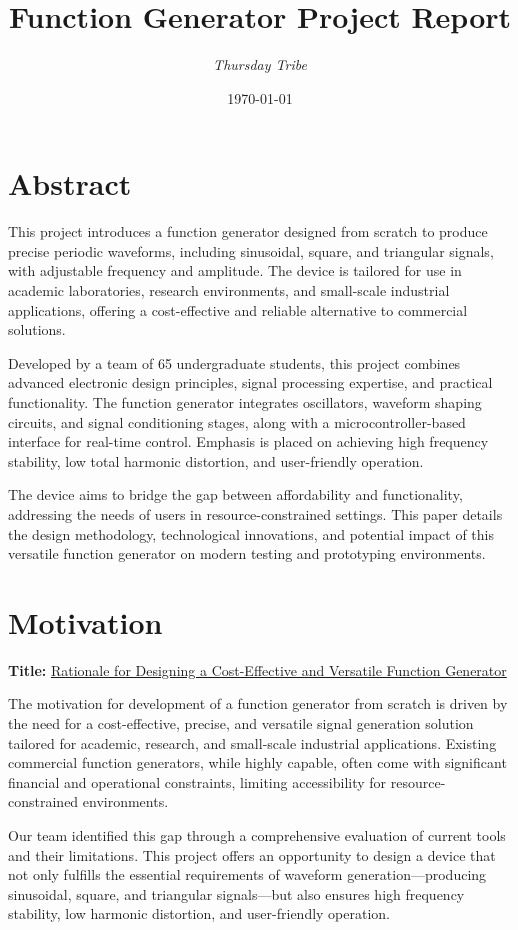 \documentclass[a4paper,12pt]{article}
\title{\textbf{Function Generator Project Report}}
\author{\textit{Thursday Tribe}}
\date{\today}
\begin{document}
\maketitle
\tableofcontents
\newpage

\section{Abstract}
This project introduces a function generator designed from scratch to produce precise periodic waveforms, including sinusoidal, square, and triangular signals, with adjustable frequency and amplitude. The device is tailored for use in academic laboratories, research environments, and small-scale industrial applications, offering a cost-effective and reliable alternative to commercial solutions.

Developed by a team of 65 undergraduate students, this project combines advanced electronic design principles, signal processing expertise, and practical functionality. The function generator integrates oscillators, waveform shaping circuits, and signal conditioning stages, along with a microcontroller-based interface for real-time control. Emphasis is placed on achieving high frequency stability, low total harmonic distortion, and user-friendly operation.

The device aims to bridge the gap between affordability and functionality, addressing the needs of users in resource-constrained settings. This paper details the design methodology, technological innovations, and potential impact of this versatile function generator on modern testing and prototyping environments.

\section{Motivation}
\textbf{Title:} \underline{Rationale for Designing a Cost-Effective and Versatile Function Generator}

The motivation for development of a function generator from scratch is driven by the need for a cost-effective, precise, and versatile signal generation solution tailored for academic, research, and small-scale industrial applications. Existing commercial function generators, while highly capable, often come with significant financial and operational constraints, limiting accessibility for resource-constrained environments.

Our team identified this gap through a comprehensive evaluation of current tools and their limitations. This project offers an opportunity to design a device that not only fulfills the essential requirements of waveform generation—producing sinusoidal, square, and triangular signals—but also ensures high frequency stability, low harmonic distortion, and user-friendly operation.
\end{document}
